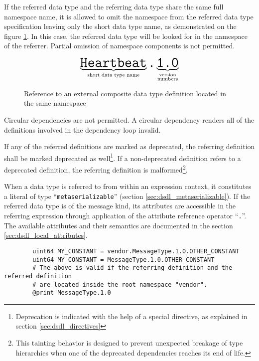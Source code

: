 If the referred data type and the referring data type share the same full namespace name,
it is allowed to omit the namespace from the referred data type specification
leaving only the short data type name, as demonstrated on the figure \ref{fig:dsdl_nested_reference_short}.
In this case, the referred data type will be looked for in the namespace of the referrer.
Partial omission of namespace components is not permitted.

\begin{figure}[H]
    $$
    \underbrace{\texttt{\huge{Heartbeat}}}_{\text{short data type name}}%
    \texttt{\huge{.}}%
    \underbrace{\texttt{\huge{1.0}}}_{\substack{\text{version} \\ \text{numbers}}}%
    $$
    \caption{Reference to an external composite data type definition located in the same namespace
             \label{fig:dsdl_nested_reference_short}}
\end{figure}

Circular dependencies are not permitted.
A circular dependency renders all of the definitions involved in the dependency loop invalid.

If any of the referred definitions are marked as deprecated,
the referring definition shall be marked deprecated as well\footnote{%
Deprecation is indicated with the help of a special directive, as explained in section \ref{sec:dsdl_directives}}.
If a non-deprecated definition refers to a deprecated definition,
the referring definition is malformed\footnote{%
This tainting behavior is designed to prevent unexpected breakage of
type hierarchies when one of the deprecated dependencies reaches its end of life.}.

When a data type is referred to from within an expression context,
it constitutes a literal of type ``\verb|metaserializable|'' (section \ref{sec:dsdl_metaserializable}).
If the referred data type is of the message kind,
its attributes are accessible in the referring expression through application of the
attribute reference operator ``\verb|.|''.
The available attributes and their semantics are documented in the section \ref{sec:dsdl_local_attributes}.

\begin{remark}
    \begin{verbatim}
        uint64 MY_CONSTANT = vendor.MessageType.1.0.OTHER_CONSTANT
        uint64 MY_CONSTANT = MessageType.1.0.OTHER_CONSTANT
        # The above is valid if the referring definition and the referred definition
        # are located inside the root namespace "vendor".
        @print MessageType.1.0
    \end{verbatim}
\end{remark}

